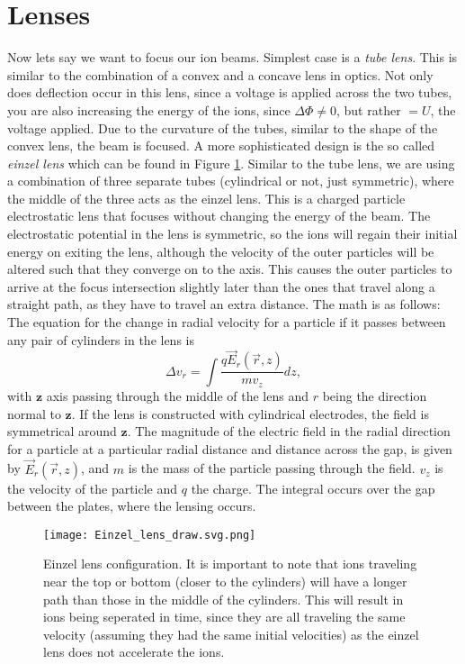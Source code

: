 \section{Lenses}\label{sec:lenses}
Now lets say we want to focus our ion beams.
Simplest case is a \textit{tube lens}.
This is similar to the combination of a convex and a concave lens in optics.
Not only does deflection occur in this lens, since a voltage is applied across the two tubes, you are also increasing the energy of the ions, since $\Delta \Phi \neq 0$, but rather $ = U$, the voltage applied.
Due to the curvature of the tubes,  similar to the shape of the convex lens, the beam is focused.
A more sophisticated design is the so called \textit{einzel lens} which can be found in Figure \ref{fig:einzel}.
Similar to the tube lens, we are using a combination of three separate tubes (cylindrical or not, just symmetric), where the middle of the three acts as the einzel lens.
This is a charged particle electrostatic lens that focuses without changing the energy of the beam.
The electrostatic potential in the lens is symmetric, so the ions will regain their initial energy on exiting the lens, although the velocity of the outer particles will be altered such that they converge on to the axis.
This causes the outer particles to arrive at the focus intersection slightly later than the ones that travel along a straight path, as they have to travel an extra distance.
The math is as follows:
The equation for the change in radial velocity for a particle if it passes between any pair of cylinders in the lens is $$\Delta v_r = \int \frac{q\vec{E}_r(\vec{r},z)}{mv_z}dz, $$ with $\textbf{z}$ axis passing through the middle of the lens and $r$ being the direction normal to $\textbf{z}$.
If the lens is constructed with cylindrical electrodes, the field is symmetrical around $\textbf{z}$.
The magnitude of the electric field in the radial direction for a particle at a particular radial distance and distance across the gap, is given by $\vec{E}_r(\vec{r},z)$, and $m$ is the mass of the particle passing through the field.
$v_z$ is the velocity of the particle and $q$ the charge.
The integral occurs over the gap between the plates, where the lensing occurs.

\begin{figure}
	\centering
	\texttt{[image: Einzel\_lens\_draw.svg.png]}
	\caption{Einzel lens configuration. It is important to note that ions traveling near the top or bottom (closer to the cylinders) will have a longer path than those in the middle of the cylinders. This will result in ions being seperated in time, since they are all traveling the same velocity (assuming they had the same initial velocities) as the einzel lens does not accelerate the ions. }
	\label{fig:einzel}
\end{figure}

